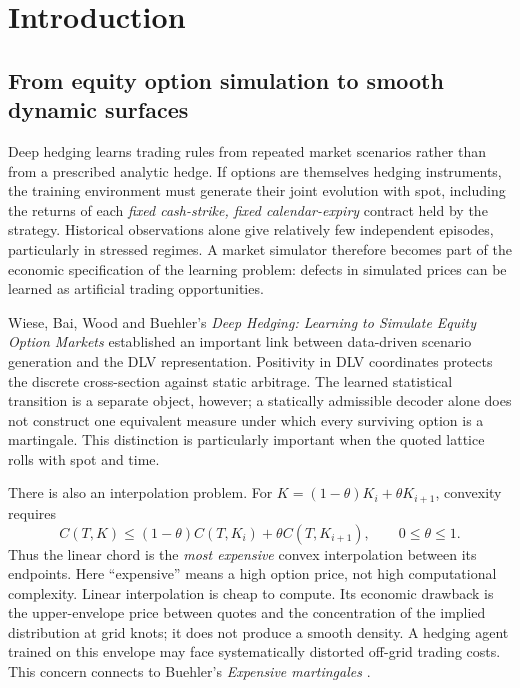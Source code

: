\documentclass[11pt,a4paper]{article}
\numberwithin{equation}{section}
\theoremstyle{definition}\newtheorem{definition}[theorem]{Definition}
\theoremstyle{remark}\newtheorem{remark}[theorem]{Remark}
\begin{document}
\section{Introduction}
\label{sec:intro}
\subsection{From equity option simulation to smooth dynamic surfaces}
Deep hedging learns trading rules from repeated market scenarios rather than from a prescribed analytic hedge. If options are themselves hedging instruments, the training environment must generate their joint evolution with spot, including the returns of each \emph{fixed cash-strike, fixed calendar-expiry} contract held by the strategy. Historical observations alone give relatively few independent episodes, particularly in stressed regimes. A market simulator therefore becomes part of the economic specification of the learning problem: defects in simulated prices can be learned as artificial trading opportunities.

Wiese, Bai, Wood and Buehler's \emph{Deep Hedging: Learning to Simulate Equity Option Markets} \cite{Wiese2019} established an important link between data-driven scenario generation and the DLV representation. Positivity in DLV coordinates protects the discrete cross-section against static arbitrage. The learned statistical transition is a separate object, however; a statically admissible decoder alone does not construct one equivalent measure under which every surviving option is a martingale. This distinction is particularly important when the quoted lattice rolls with spot and time.

There is also an interpolation problem. For $K=(1-\theta)K_i+\theta K_{i+1}$, convexity requires
\begin{equation}
 C(T,K)\leq (1-\theta)C(T,K_i)+\theta C(T,K_{i+1}),\qquad 0\leq\theta\leq1.
 \label{eq:chord}
\end{equation}
Thus the linear chord is the \emph{most expensive} convex interpolation between its endpoints. Here ``expensive'' means a high option price, not high computational complexity. Linear interpolation is cheap to compute. Its economic drawback is the upper-envelope price between quotes and the concentration of the implied distribution at grid knots; it does not produce a smooth density. A hedging agent trained on this envelope may face systematically distorted off-grid trading costs. This concern connects to Buehler's \emph{Expensive martingales} \cite{Expensive}.
\end{document}
